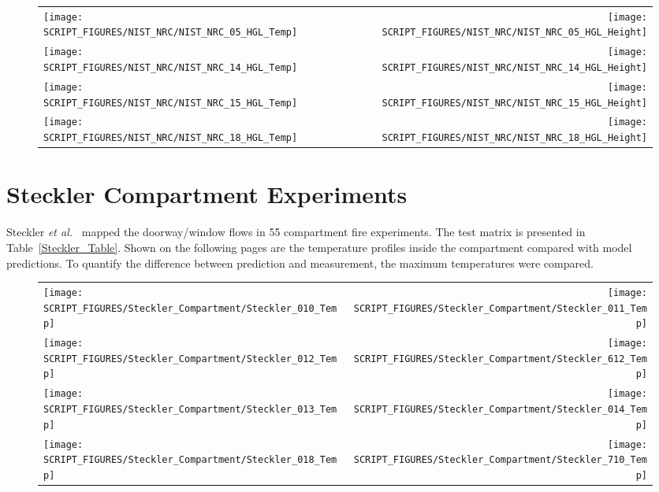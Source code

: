 \begin{figure}[p]
\begin{tabular*}{\textwidth}{l@{\extracolsep{\fill}}r}
\texttt{[image: SCRIPT\_FIGURES/NIST\_NRC/NIST\_NRC\_05\_HGL\_Temp]} &
\texttt{[image: SCRIPT\_FIGURES/NIST\_NRC/NIST\_NRC\_05\_HGL\_Height]} \\
\texttt{[image: SCRIPT\_FIGURES/NIST\_NRC/NIST\_NRC\_14\_HGL\_Temp]} &
\texttt{[image: SCRIPT\_FIGURES/NIST\_NRC/NIST\_NRC\_14\_HGL\_Height]} \\
\texttt{[image: SCRIPT\_FIGURES/NIST\_NRC/NIST\_NRC\_15\_HGL\_Temp]} &
\texttt{[image: SCRIPT\_FIGURES/NIST\_NRC/NIST\_NRC\_15\_HGL\_Height]} \\
\texttt{[image: SCRIPT\_FIGURES/NIST\_NRC/NIST\_NRC\_18\_HGL\_Temp]} &
\texttt{[image: SCRIPT\_FIGURES/NIST\_NRC/NIST\_NRC\_18\_HGL\_Height]}
\end{tabular*}
\end{figure}


\clearpage


\section{Steckler Compartment Experiments}

Steckler {\em et al.}~\cite{Steckler:NBSIR_82-2520} mapped the doorway/window flows in 55 compartment fire experiments. The test matrix is presented in Table~\ref{Steckler_Table}. Shown on the following pages are the temperature profiles inside the compartment compared with model predictions. To quantify the difference between prediction and measurement, the maximum temperatures were compared.

\newpage

\begin{figure}[p]
\begin{tabular*}{\textwidth}{l@{\extracolsep{\fill}}r}
\texttt{[image: SCRIPT\_FIGURES/Steckler\_Compartment/Steckler\_010\_Temp]} &
\texttt{[image: SCRIPT\_FIGURES/Steckler\_Compartment/Steckler\_011\_Temp]} \\
\texttt{[image: SCRIPT\_FIGURES/Steckler\_Compartment/Steckler\_012\_Temp]} &
\texttt{[image: SCRIPT\_FIGURES/Steckler\_Compartment/Steckler\_612\_Temp]} \\
\texttt{[image: SCRIPT\_FIGURES/Steckler\_Compartment/Steckler\_013\_Temp]} &
\texttt{[image: SCRIPT\_FIGURES/Steckler\_Compartment/Steckler\_014\_Temp]} \\
\texttt{[image: SCRIPT\_FIGURES/Steckler\_Compartment/Steckler\_018\_Temp]} &
\texttt{[image: SCRIPT\_FIGURES/Steckler\_Compartment/Steckler\_710\_Temp]}
\end{tabular*}
\label{Steckler_Temp_1}
\end{figure}

